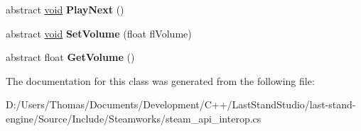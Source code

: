 \begin{DoxyCompactItemize}
\item 
\hypertarget{classValve_1_1Steamworks_1_1ISteamMusic_a2cf12590c54bb6b21aebe3d6cd2b4d85}{}abstract \hyperlink{SDL__audio_8h_a52835ae37c4bb905b903cbaf5d04b05f}{void} {\bfseries Play\+Next} ()\label{classValve_1_1Steamworks_1_1ISteamMusic_a2cf12590c54bb6b21aebe3d6cd2b4d85}

\item 
\hypertarget{classValve_1_1Steamworks_1_1ISteamMusic_a5c4f31b52efb921cc64b13c2099d8a3b}{}abstract \hyperlink{SDL__audio_8h_a52835ae37c4bb905b903cbaf5d04b05f}{void} {\bfseries Set\+Volume} (float fl\+Volume)\label{classValve_1_1Steamworks_1_1ISteamMusic_a5c4f31b52efb921cc64b13c2099d8a3b}

\item 
\hypertarget{classValve_1_1Steamworks_1_1ISteamMusic_a87f5db0857380d9062c62563f0c4eb25}{}abstract float {\bfseries Get\+Volume} ()\label{classValve_1_1Steamworks_1_1ISteamMusic_a87f5db0857380d9062c62563f0c4eb25}

\end{DoxyCompactItemize}


The documentation for this class was generated from the following file\+:\begin{DoxyCompactItemize}
\item 
D\+:/\+Users/\+Thomas/\+Documents/\+Development/\+C++/\+Last\+Stand\+Studio/last-\/stand-\/engine/\+Source/\+Include/\+Steamworks/steam\+\_\+api\+\_\+interop.\+cs\end{DoxyCompactItemize}
